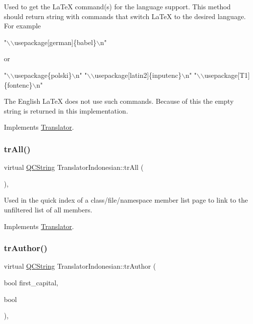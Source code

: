 Used to get the La\+TeX command(s) for the language support. This method should return string with commands that switch La\+TeX to the desired language. For example 
\begin{DoxyPre}"\(\backslash\)\(\backslash\)usepackage[german]\{babel\}\(\backslash\)n"
 \end{DoxyPre}
 or 
\begin{DoxyPre}"\(\backslash\)\(\backslash\)usepackage\{polski\}\(\backslash\)n"
 "\(\backslash\)\(\backslash\)usepackage[latin2]\{inputenc\}\(\backslash\)n"
 "\(\backslash\)\(\backslash\)usepackage[T1]\{fontenc\}\(\backslash\)n"
 \end{DoxyPre}


The English La\+TeX does not use such commands. Because of this the empty string is returned in this implementation. 

Implements \mbox{\hyperlink{class_translator}{Translator}}.

\mbox{\label{class_translator_indonesian_aaaf070af56dca64079303a05695a3eb6}} 
\subsubsection{\texorpdfstring{trAll()}{trAll()}}
{\footnotesize\ttfamily virtual \mbox{\hyperlink{class_q_c_string}{Q\+C\+String}} Translator\+Indonesian\+::tr\+All (\begin{DoxyParamCaption}{ }\end{DoxyParamCaption})\hspace{0.3cm}{\ttfamily [inline]}, {\ttfamily [virtual]}}

Used in the quick index of a class/file/namespace member list page to link to the unfiltered list of all members. 

Implements \mbox{\hyperlink{class_translator}{Translator}}.

\mbox{\label{class_translator_indonesian_ad5fb31ccc0813683f8c55812a64911c6}} 
\subsubsection{\texorpdfstring{trAuthor()}{trAuthor()}}
{\footnotesize\ttfamily virtual \mbox{\hyperlink{class_q_c_string}{Q\+C\+String}} Translator\+Indonesian\+::tr\+Author (\begin{DoxyParamCaption}\item[{bool}]{first\+\_\+capital,  }\item[{bool}]{ }\end{DoxyParamCaption})\hspace{0.3cm}{\ttfamily [inline]}, {\ttfamily [virtual]}}

